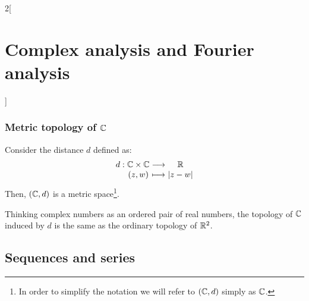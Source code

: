 \documentclass[../../../main.tex]{subfiles}
\begin{document}
\begin{multicols}{2}[\section{Complex analysis and Fourier analysis}]
  \subsubsection{Metric topology of \texorpdfstring{$\mathbb{C}$}{C}}
  \begin{prop}
    Consider the distance $d$ defined as: $$\function{d}{\CC\times\CC}{\RR}{(z,w)}{|z-w|}$$ Then, $(\mathbb{C},d)$ is a metric space\footnote{In order to simplify the notation we will refer to $(\mathbb{C},d)$ simply as $\mathbb{C}$.}.
  \end{prop}
  \begin{prop}
    Thinking complex numbers as an ordered pair of real numbers, the topology of $\mathbb{C}$ induced by $d$ is the same as the ordinary topology of $\mathbb{R}^2$.
  \end{prop}
  \subsection{Sequences and series}

\end{multicols}
\end{document}
